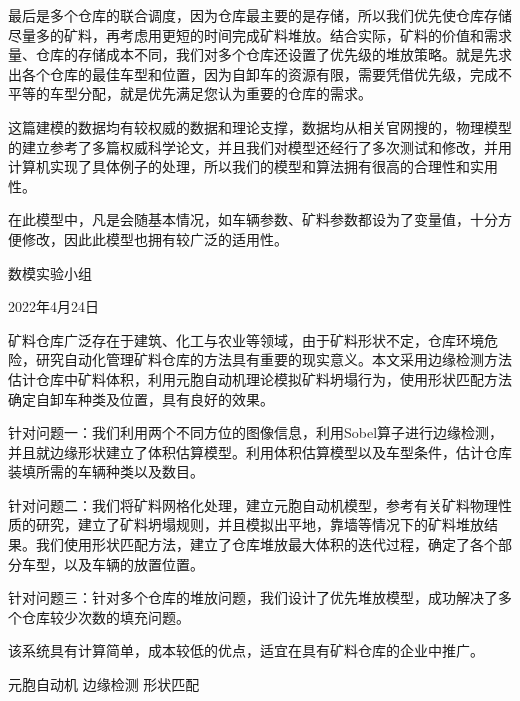 \documentclass{my_paper}
\begin{document}
最后是多个仓库的联合调度，因为仓库最主要的是存储，所以我们优先使仓库存储尽量多的矿料，再考虑用更短的时间完成矿料堆放。结合实际，矿料的价值和需求量、仓库的存储成本不同，我们对多个仓库还设置了优先级的堆放策略。就是先求出各个仓库的最佳车型和位置，因为自卸车的资源有限，需要凭借优先级，完成不平等的车型分配，就是优先满足您认为重要的仓库的需求。

这篇建模的数据均有较权威的数据和理论支撑，数据均从相关官网搜的，物理模型的建立参考了多篇权威科学论文，并且我们对模型还经行了多次测试和修改，并用计算机实现了具体例子的处理，所以我们的模型和算法拥有很高的合理性和实用性。

在此模型中，凡是会随基本情况，如车辆参数、矿料参数都设为了变量值，十分方便修改，因此此模型也拥有较广泛的适用性。

\begin{flushright}
    数模实验小组

    2022年4月24日
\end{flushright}


\newpage
\begin{center}
\lunwenbiaoti

\vspace{2ex}
\zhaiyao
\end{center}


矿料仓库广泛存在于建筑、化工与农业等领域，由于矿料形状不定，仓库环境危险，研究自动化管理矿料仓库的方法具有重要的现实意义。本文采用边缘检测方法估计仓库中矿料体积，利用元胞自动机理论模拟矿料坍塌行为，使用形状匹配方法确定自卸车种类及位置，具有良好的效果。

针对问题一：我们利用两个不同方位的图像信息，利用Sobel算子进行边缘检测，并且就边缘形状建立了体积估算模型。利用体积估算模型以及车型条件，估计仓库装填所需的车辆种类以及数目。

针对问题二：我们将矿料网格化处理，建立元胞自动机模型，参考有关矿料物理性质的研究，建立了矿料坍塌规则，并且模拟出平地，靠墙等情况下的矿料堆放结果。我们使用形状匹配方法，建立了仓库堆放最大体积的迭代过程，确定了各个部分车型，以及车辆的放置位置。

针对问题三：针对多个仓库的堆放问题，我们设计了优先堆放模型，成功解决了多个仓库较少次数的填充问题。

该系统具有计算简单，成本较低的优点，适宜在具有矿料仓库的企业中推广。

\begin{guanjianci}
 元胞自动机 \quad 边缘检测 \quad 形状匹配
\end{guanjianci}

\newpage
\end{document}
